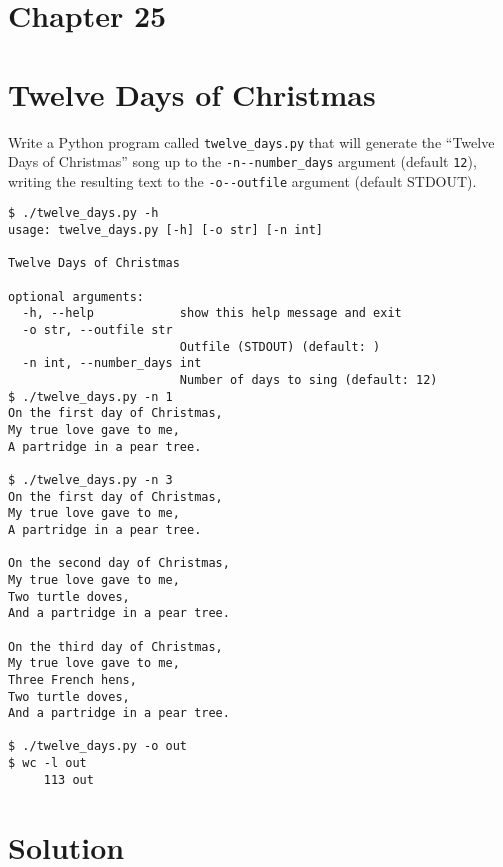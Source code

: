\documentclass[]{article}
\begin{document}
\pagebreak

\hypertarget{chapter-25}{%
\section{Chapter 25}\label{chapter-25}}

\hypertarget{twelve-days-of-christmas}{%
\section{Twelve Days of Christmas}\label{twelve-days-of-christmas}}

Write a Python program called \texttt{twelve\_days.py} that will
generate the ``Twelve Days of Christmas'' song up to the
\texttt{-n\textbar{}-\/-number\_days} argument (default \texttt{12}),
writing the resulting text to the \texttt{-o\textbar{}-\/-outfile}
argument (default STDOUT).

\begin{verbatim}
$ ./twelve_days.py -h
usage: twelve_days.py [-h] [-o str] [-n int]

Twelve Days of Christmas

optional arguments:
  -h, --help            show this help message and exit
  -o str, --outfile str
                        Outfile (STDOUT) (default: )
  -n int, --number_days int
                        Number of days to sing (default: 12)
$ ./twelve_days.py -n 1
On the first day of Christmas,
My true love gave to me,
A partridge in a pear tree.

$ ./twelve_days.py -n 3
On the first day of Christmas,
My true love gave to me,
A partridge in a pear tree.

On the second day of Christmas,
My true love gave to me,
Two turtle doves,
And a partridge in a pear tree.

On the third day of Christmas,
My true love gave to me,
Three French hens,
Two turtle doves,
And a partridge in a pear tree.

$ ./twelve_days.py -o out
$ wc -l out
     113 out
\end{verbatim}

\pagebreak

\hypertarget{solution-20}{%
\section{Solution}\label{solution-20}}
\end{document}
